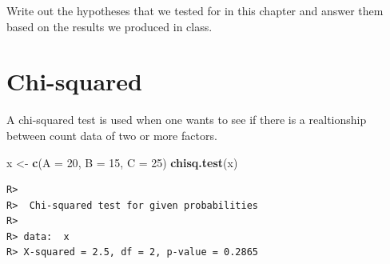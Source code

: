 \documentclass[english,10pt,a4paper,oneside]{book}
\newenvironment{Shaded}{\begin{snugshade}}{\end{snugshade}}
\newcommand{\DataTypeTok}[1]{\textcolor[rgb]{0.13,0.29,0.53}{#1}}
\newcommand{\DecValTok}[1]{\textcolor[rgb]{0.00,0.00,0.81}{#1}}
\newcommand{\KeywordTok}[1]{\textcolor[rgb]{0.13,0.29,0.53}{\textbf{#1}}}
\newcommand{\NormalTok}[1]{#1}
\newcommand{\StringTok}[1]{\textcolor[rgb]{0.31,0.60,0.02}{#1}}
\theoremstyle{definition}
\theoremstyle{definition}
\theoremstyle{definition}
\theoremstyle{remark}
\begin{document}
Write out the hypotheses that we tested for in this chapter and answer
them based on the results we produced in class.

\hypertarget{chi-squared}{%
\chapter{Chi-squared}\label{chi-squared}}

A chi-squared test is used when one wants to see if there is a
realtionship between count data of two or more factors.

\begin{Shaded}
\begin{Highlighting}[]
\NormalTok{x <-}\StringTok{ }\KeywordTok{c}\NormalTok{(}\DataTypeTok{A =} \DecValTok{20}\NormalTok{, }\DataTypeTok{B =} \DecValTok{15}\NormalTok{, }\DataTypeTok{C =} \DecValTok{25}\NormalTok{)}
\KeywordTok{chisq.test}\NormalTok{(x)}
\end{Highlighting}
\end{Shaded}

\begin{verbatim}
R> 
R>  Chi-squared test for given probabilities
R> 
R> data:  x
R> X-squared = 2.5, df = 2, p-value = 0.2865
\end{verbatim}


\end{document}
